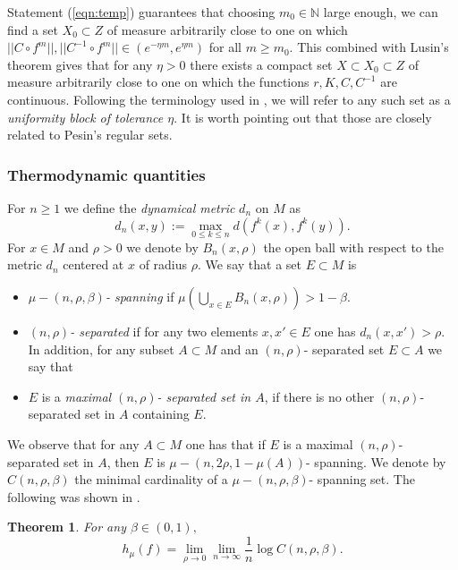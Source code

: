 \documentclass{amsart}
\theoremstyle{plain}
\newtheorem{thm}{Theorem}[section]
\theoremstyle{definition}
\theoremstyle{remark}
\numberwithin{equation}{section}
\begin{document}
Statement (\ref{eqn:temp}) guarantees that choosing $m_0\in\mathbb{N}$ large enough, we can find a set $X_0\subset Z$ of measure arbitrarily close to one on which $     ||   C\circ f^m||, ||C^{-1}\circ f^m||\in  ( e^{-\eta m}, e^{\eta m})$ for all $m\geq m_0$.
This combined with Lusin's theorem gives that for any $\eta>0$ there exists a compact set $X \subset X_0 \subset Z$ of measure arbitrarily close to one on which the functions $r,K,C, C^{-1}$ are continuous.
Following the terminology used in \cite{ACW}, we will refer to any such set as a \textit{uniformity block of tolerance $\eta$}. It is worth pointing out that those are closely related to Pesin's regular sets.

\subsubsection{Thermodynamic quantities}\label{sec:thermodynamic}

For $n\geq 1$ we define the \textit{dynamical metric} $d_n$ on $M$ as
$$  d_n(x,y):=  \max_{0\leq k\leq n} d(f^k(x),f^k(y)) . $$
For $x\in M$ and $\rho>0$ we denote by $B_n(x,\rho)$ the open ball with respect to the metric $d_n$ centered at $x$ of radius $\rho$.
We say that a set $E\subset M$ is
\begin{itemize} 
\item \textit{$\mu-(n,\rho,\beta)$- spanning} if $ \mu   ( \bigcup_{x\in E}  B_n(x,\rho) )   > 1-\beta.$
\item \textit{$(n,\rho)$- separated} if for any two elements $x,x'\in E$ one has $d_n(x,x')>\rho$.
\newline In addition, for any subset $A\subset M$ and an $(n,\rho)$- separated set $E\subset A$ we say that 
\item $E$ is a \textit{maximal $(n,\rho)$- separated set in  $A$}, if there is no other  $(n,\rho)$- separated set in  $A$ containing $E$.
\end{itemize}

We observe that for any $A\subset M$ one has that if $E$ is a maximal $(n,\rho)$- separated set in  $A$, then $E$ is $\mu-(n,2 \rho,1-\mu(A))$- spanning.
We denote by $C(n,\rho,\beta)$ the minimal cardinality of a $\mu-(n,\rho,\beta)$- spanning set. The following was shown in \cite[Theorem 1.1]{Katok1980}.

\begin{thm}\label{thm:entr}
For any $\beta \in (0,1) ,$
$$  h_{\mu}(f) =      \lim_{\rho\to 0}    \lim_{n\to \infty}  \frac{1}{n} \log   C(n,\rho,\beta).$$
\end{thm}
\end{document}
